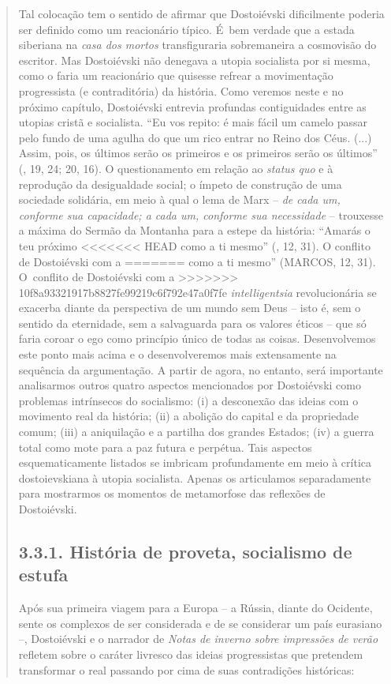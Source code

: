 {\begin{quote}
Tal colocação tem o sentido de afirmar que Dostoiévski dificilmente
poderia ser definido como um reacionário típico. É~bem verdade que a
estada siberiana na \emph{casa dos mortos} transfiguraria sobremaneira a
cosmovisão do escritor. Mas Dostoiévski não denegava a utopia socialista
por si mesma, como o faria um reacionário que quisesse refrear a
movimentação progressista (e contraditória) da história. Como veremos
neste e no próximo capítulo, Dostoiévski entrevia profundas
contiguidades entre as utopias cristã e socialista. ``Eu vos repito: é
mais fácil um camelo passar pelo fundo de uma agulha do que um rico
entrar no Reino dos Céus. (...) Assim, pois, os últimos serão os
primeiros e os primeiros serão os últimos'' (, 19, 24; 20, 16). O
questionamento em relação ao \emph{status quo} e à reprodução da
desigualdade social; o ímpeto de construção de uma sociedade solidária,
em meio à qual o lema de Marx -- \emph{de cada um, conforme sua
capacidade; a cada um, conforme sua necessidade} -- trouxesse a máxima
do Sermão da Montanha para a estepe da história: ``Amarás o teu próximo
<<<<<<< HEAD
como a ti mesmo'' (, 12, 31). O conflito de Dostoiévski com a
=======
como a ti mesmo'' (MARCOS, 12, 31). O~conflito de Dostoiévski com a
>>>>>>> 10f8a93321917b8827fe99219c6f792e47a0f7fe
\emph{intelligentsia} revolucionária se exacerba diante da perspectiva
de um mundo sem Deus -- isto é, sem o sentido da eternidade, sem a
salvaguarda para os valores éticos -- que só faria coroar o ego como
princípio único de todas as coisas. Desenvolvemos este ponto mais acima
e o desenvolveremos mais extensamente na sequência da argumentação. A
partir de agora, no entanto, será importante analisarmos outros quatro
aspectos mencionados por Dostoiévski como problemas intrínsecos do
socialismo: (i) a desconexão das ideias com o movimento real da
história; (ii) a abolição do capital e da propriedade comum; (iii) a
aniquilação e a partilha dos grandes Estados; (iv) a guerra total como
mote para a paz futura e perpétua. Tais aspectos esquematicamente
listados se imbricam profundamente em meio à crítica dostoievskiana à
utopia socialista. Apenas os articulamos separadamente para mostrarmos
os momentos de metamorfose das reflexões de Dostoiévski.

\subsection{3.3.1. História de proveta, socialismo de estufa}

Após sua primeira viagem para a Europa -- a Rússia, diante do Ocidente,
sente os complexos de ser considerada e de se considerar um país
eurasiano --, Dostoiévski e o narrador de \emph{Notas de inverno sobre
impressões de verão} refletem sobre o caráter livresco das ideias
progressistas que pretendem transformar o real passando por cima de suas
contradições históricas:


\end{quote}}

